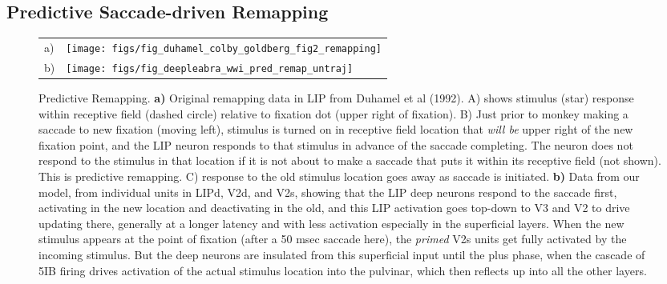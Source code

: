 \documentclass[11pt,twoside]{article}
\newif\myifpdf
\begin{document}
\subsection{Predictive Saccade-driven Remapping}

\begin{figure}
  \begin{center}
    \begin{tabular}{ll}
      \parbox[b]{.1em}{a) \vspace*{1.4in}} &
      \texttt{[image: figs/fig\_duhamel\_colby\_goldberg\_fig2\_remapping]} \\
      \parbox[b]{.1em}{b) \vspace*{1.4in}} &
      \texttt{[image: figs/fig\_deepleabra\_wwi\_pred\_remap\_untraj]}
    \end{tabular}
  \end{center}
  \caption{Predictive Remapping.  {\bf a)} Original remapping data in LIP from Duhamel et al (1992).  A) shows stimulus (star) response within receptive field (dashed circle) relative to fixation dot (upper right of fixation).  B) Just prior to monkey making a saccade to new fixation (moving left), stimulus is turned on in receptive field location that {\em will be} upper right of the new fixation point, and the LIP neuron responds to that stimulus in advance of the saccade completing.  The neuron does not respond to the stimulus in that location if it is not about to make a saccade that puts it within its receptive field (not shown).  This is predictive remapping.  C) response to the old stimulus location goes away as saccade is initiated.  {\bf b)} Data from our model, from individual units in LIPd, V2d, and V2s, showing that the LIP deep neurons respond to the saccade first, activating in the new location and deactivating in the old, and this LIP activation goes top-down to V3 and V2 to drive updating there, generally at a longer latency and with less activation especially in the superficial layers.  When the new stimulus appears at the point of fixation (after a 50 msec saccade here), the {\em primed} V2s units get fully activated by the incoming stimulus.  But the deep neurons are insulated from this superficial input until the plus phase, when the cascade of 5IB firing drives activation of the actual stimulus location into the pulvinar, which then reflects up into all the other layers.}
  \label{fig.remap_units}
\end{figure}
\end{document}

